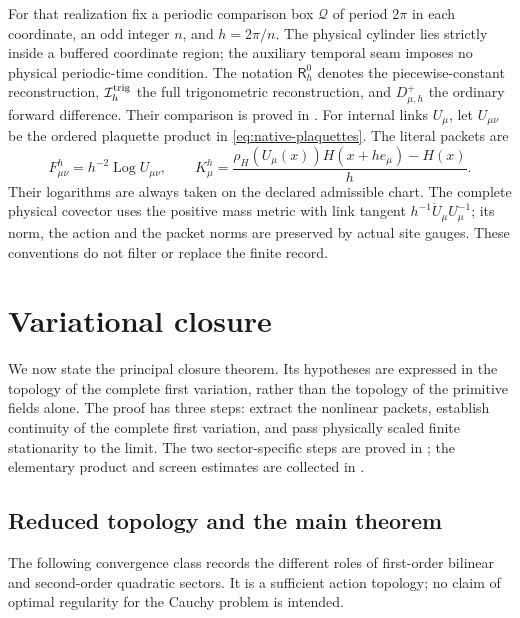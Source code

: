 \documentclass[11pt]{article}
\numberwithin{equation}{section}
\theoremstyle{definition}
\theoremstyle{remark}
\begin{document}
For that realization fix a periodic comparison box $\mathscr Q$ of period
$2\pi$ in each coordinate, an odd integer $n$, and $h=2\pi/n$.
The physical cylinder lies strictly inside a buffered coordinate region;
the auxiliary temporal seam imposes no physical periodic-time condition.
The notation $\mathsf R_h^0$ denotes the piecewise-constant reconstruction,
$\mathcal I_h^{\rm trig}$ the full trigonometric reconstruction, and
$D^+_{\mu,h}$ the ordinary forward difference. Their comparison is proved in
.
For internal links $U_\mu$, let $U_{\mu\nu}$ be the ordered plaquette
product in \eqref{eq:native-plaquettes}. The literal packets are
\[
 F^h_{\mu\nu}=h^{-2}\operatorname{Log}U_{\mu\nu},\qquad
 K^h_\mu=\frac{\rho_H(U_\mu(x))H(x+he_\mu)-H(x)}h.
\]
Their logarithms are always taken on the declared admissible chart.
The complete physical covector uses the positive mass metric with link
tangent $h^{-1}\dot U_\mu U_\mu^{-1}$; its norm, the action and the packet
norms are preserved by actual site gauges. These conventions do not filter
or replace the finite record.

\section{Variational closure}
\label{sec:limit}

We now state the principal closure theorem. Its hypotheses are expressed
in the topology of the complete first variation, rather than the topology
of the primitive fields alone. The proof has three steps: extract the
nonlinear packets, establish continuity of the complete first variation,
and pass physically scaled finite stationarity to the limit. The two
sector-specific steps are proved in ; the
elementary product and screen estimates are collected in
.

\subsection{Reduced topology and the main theorem}
\label{subsec:reduced-main}

The following convergence class records the different roles of first-order
bilinear and second-order quadratic sectors.  It is a sufficient action
topology; no claim of optimal regularity for the Cauchy problem is intended.
\end{document}
